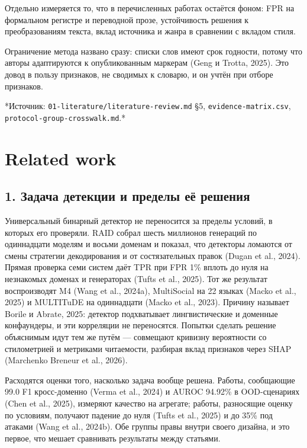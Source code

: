 \documentclass[11pt,a4paper]{article}
\renewcommand{\_}{\textunderscore\allowbreak}
\begin{document}
Отдельно измеряется то, что в перечисленных работах остаётся фоном: FPR на
формальном регистре и переводной прозе, устойчивость решения к преобразованиям
текста, вклад источника и жанра в сравнении с вкладом стиля.

Ограничение метода названо сразу: списки слов имеют срок годности, потому что
авторы адаптируются к опубликованным маркерам (Geng и Trotta, 2025). Это довод в пользу
признаков, не сводимых к словарю, и он учтён при отборе признаков.

*Источник: \texttt{01-\allowbreak{}literature/literature-\allowbreak{}review.md} §5, \texttt{evidence-\allowbreak{}matrix.csv},
\texttt{protocol-\allowbreak{}group-\allowbreak{}crosswalk.md}.*

\section{Related work}

\subsection{1. Задача детекции и пределы её решения}

Универсальный бинарный детектор не переносится за пределы условий, в которых его
проверяли. RAID собрал шесть миллионов генераций по одиннадцати моделям и восьми
доменам и показал, что детекторы ломаются от смены стратегии декодирования и от
состязательных правок (Dugan et al., 2024). Прямая проверка семи систем даёт TPR при FPR 1\%
вплоть до нуля на незнакомых доменах и генераторах (Tufts et al., 2025). Тот же результат
воспроизводят M4 (Wang et al., 2024a), MultiSocial на 22 языках (Macko et al., 2025) и MULTITuDE на
одиннадцати (Macko et al., 2023). Причину называет Borile и Abrate, 2025: детектор подхватывает лингвистические
и доменные конфаундеры, и эти корреляции не переносятся. Попытки сделать решение
объяснимым идут тем же путём — совмещают кривизну вероятности со стилометрией и
метриками читаемости, разбирая вклад признаков через SHAP (Marchenko Breneur et al., 2026).

Расходятся оценки того, насколько задача вообще решена. Работы, сообщающие
99.0 F1 кросс-доменно (Verma et al., 2024) и AUROC 94.92\% в OOD-сценариях (Chen et al., 2025), измеряют
качество на агрегате; работы, разносящие оценку по условиям, получают падение до
нуля (Tufts et al., 2025) и до 35\% под атаками (Wang et al., 2024b). Обе группы правы внутри своего дизайна,
и это первое, что мешает сравнивать результаты между статьями.
\end{document}
